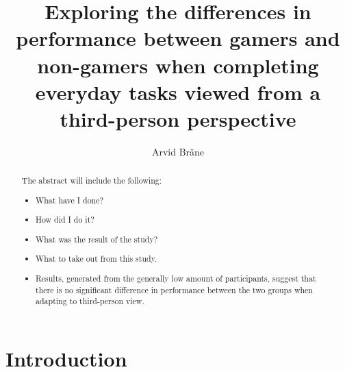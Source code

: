 \documentclass[runningheads,a4paper,oribibl]{llncs}
\begin{document}
\pagestyle{headings}

\mainmatter

\title{Exploring the differences in performance between gamers and non-gamers when completing everyday tasks viewed from a third-person perspective}



\author{Arvid Bräne}


\maketitle


\begin{abstract}
	

The abstract will include the following:
\begin{itemize}
	\item What have I done?
	\item How did I do it?
	\item What was the result of the study?
	\item What to take out from this study.
	\item Results, generated from the generally low amount of participants, suggest that there is no significant difference in performance between the two groups when adapting to third-person view.  
\end{itemize}

\end{abstract}











\section{Introduction}
\end{document}
